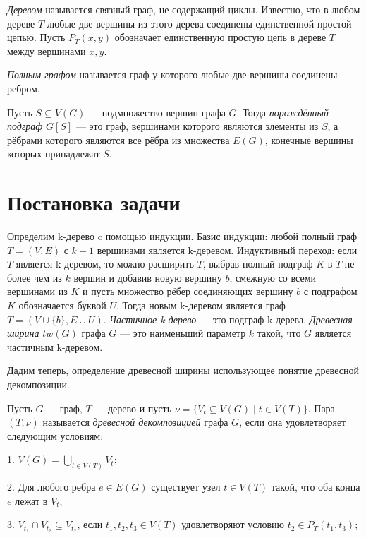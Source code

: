 \documentclass[a4paper,12pt]{article}
\begin{document}
\begin{large}
		{\it Деревом} называется связный граф, не содержащий циклы. Известно, что в любом дереве $T$ любые две вершины из этого дерева соединены единственной простой цепью. 
		Пусть $P_T(x, y)$ обозначает единственную простую цепь в дереве $T$ между вершинами $x, y$.

		{\it Полным графом} называется граф у которого любые две вершины соединены ребром.

		Пусть $S \subseteq V(G)$ --- подмножество вершин графа $G$. Тогда {\it порождённый подграф} $G[S]$ --- это граф, вершинами которого являются элементы из $S$, а рёбрами которого являются все рёбра из множества $E(G)$, конечные вершины которых принадлежат $S$.
		
		\newpage
		\section{Постановка задачи}
		\renewcommand{\baselinestretch}{1.5}
		\begin{large}
		
		Определим k-дерево c помощью индукции.
		Базис индукции: любой полный граф $T=(V, E)$ с $k+1$ вершинами является k-деревом. Индуктивный переход:
		если $T$ является k-деревом, то можно расширить $T$, выбрав полный подграф $K$ в $T$ не более чем из $k$ вершин и добавив новую вершину $b$, смежную со всеми вершинами из $K$ и пусть множество рёбер соединяющих вершину $b$ с подграфом $K$ обозначается буквой $U$.
		Тогда новым k-деревом является граф $T=(V \cup \{b\}, E \cup U)$.
		{\it Частичное k-дерево} --- это подграф k-дерева.
		{\it Древесная ширина} $tw(G)$ графа $G$ --- это наименьший параметр $k$ такой, что $G$ является частичным k-деревом.

		Дадим теперь, определение древесной ширины использующее понятие древесной декомпозиции.

		Пусть $G$ --- граф,  $T$ --- дерево и пусть $\nu = \{V_t \subseteq V(G) \mid t \in V(T)\}$.
		Пара $(T, \nu)$ называется {\it древесной декомпозицией} графа $G$, если она удовлетворяет следующим условиям:

		1. $V(G) = \bigcup \limits_{t \in V(T)}V_t$;

		2. Для любого ребра $e \in E(G)$ существует узел $t \in V(T)$ такой, что оба конца  $e$ лежат в $V_t$;

		3. $V_{t_1} \cap V_{t_3} \subseteq V_{t_2}$, если $t_1, t_2, t_3 \in V(T)$ удовлетворяют условию $t_2 \in P_T(t_1, t_3)$;

\end{large}
\end{large}
\end{document}
